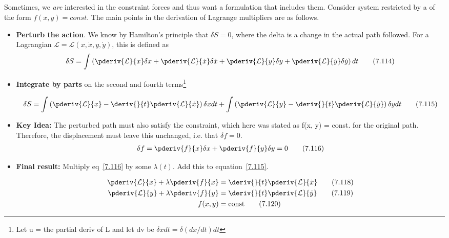 \documentclass[10pt, twocolumn]{article}
\DeclareRobustCommand{\mybox}[2][gray!20]{%
	\begin{tcolorbox}[   %
		breakable,
		left=0pt,
		right=0pt,
		top=-13pt,
		bottom=0pt,
		colback=#1,
		colframe=#1,
		width=0.45\dimexpr\textwidth\relax,
		enlarge left by=0mm,
		boxsep=1pt,
		arc=0pt,outer arc=0pt,
		]
		#2
	\end{tcolorbox}
}
\newcommand\graybox[1]{ \mybox[gray!20]{\begin{align}#1\end{align}} }
\newcommand\p{\Needspace{10\baselineskip} \noindent}
\newcommand\tlab[1]{\tag{#1}\label{#1}}
\begin{document}
\subsection{}
\p Sometimes, we \textit{are} interested in the constraint forces and thus want a formulation that includes them. Consider system restricted by a  of the form $f(x, y) = const$. The main points in the derivation of Lagrange multipliers are as follows.
\begin{itemize}
	\item \textbf{Perturb the action}. We know by Hamilton's principle that $\delta S = 0$, where the delta is a change in the actual path followed. For a Lagrangian $\mathcal L = \mathcal L (x, \dot x, y, \dot y)$, this is defined as
	\begin{align}
	\delta S = \int \left(\pderiv{\mathcal L}{x}\delta x  + \pderiv{\mathcal L}{\dot x}\delta \dot x + \pderiv{\mathcal L}{y}\delta y  + \pderiv{\mathcal L}{\dot y}\delta \dot y \right) dt \tlab{7.114}
	\end{align}
	
	\item \textbf{Integrate by parts} on the second and fourth terms\footnote{Let u = the partial deriv of L and let dv be $\delta \dot x dt= \delta(dx/dt)dt$ }
	
	\begin{align}
	\delta S 
	= \int \left(\pderiv{\mathcal L}{x}-\deriv{}{t} \pderiv{\mathcal L}{\dot x} \right) \delta x dt
	+ \int \left(\pderiv{\mathcal L}{y}-\deriv{}{t} \pderiv{\mathcal L}{\dot y} \right) \delta y dt\tlab{7.115}
\end{align}

	\item \textbf{Key Idea:} The perturbed path must also satisfy the constraint, which here was stated as f(x, y) = const. for the original path. Therefore, the displacement must leave this unchanged, i.e. that $\delta f = 0$. 
	\begin{align}
		\delta f = \pderiv{f}{x}\delta x + \pderiv{f}{y} \delta y = 0 \tlab{7.116}
	\end{align}
	
	\item \textbf{Final result:} Multiply eq~\ref{7.116} by some $\lambda(t)$. Add this to equation~\ref{7.115}. 
	\graybox{
		\pderiv{\mathcal L}{x} + \lambda \pderiv{f}{x} &= \deriv{}{t} \pderiv{\mathcal L}{\dot x} \tlab{7.118} \\
		\pderiv{\mathcal L}{y} + \lambda \pderiv{f}{y}&= \deriv{}{t} \pderiv{\mathcal L}{\dot y} \tlab{7.119} \\
		f(x, y) &= \text{const} \tlab{7.120}
		}
\end{itemize} 
\end{document}
